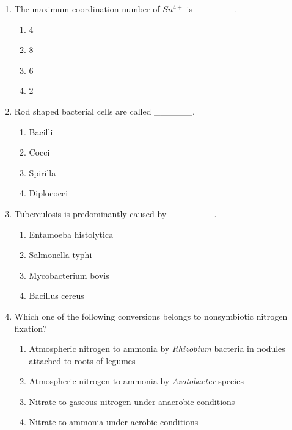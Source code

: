 \documentclass[journal]{IEEEtran}
\begin{document}
\begin{enumerate}
\item The maximum coordination number of $Sn^{4+}$ is \_\_\_\_\_\_.
\hfill{}

\begin{multicols}{2}
\begin{enumerate}
\item 4
\item 8
\item 6
\item 2
\end{enumerate}
\end{multicols}

\item Rod shaped bacterial cells are called \_\_\_\_\_\_.
\hfill{}

\begin{multicols}{2}
\begin{enumerate}
\item Bacilli
\item Cocci
\item Spirilla
\item Diplococci
\end{enumerate}
\end{multicols}

\item Tuberculosis is predominantly caused by \_\_\_\_\_\_\_.
\hfill{}

\begin{multicols}{2}
\begin{enumerate}
\item Entamoeba histolytica
\item Salmonella typhi
\item Mycobacterium bovis
\item Bacillus cereus
\end{enumerate}
\end{multicols}

\item Which one of the following conversions belongs to nonsymbiotic nitrogen fixation?
\hfill{}

\begin{enumerate}
\item Atmospheric nitrogen to ammonia by \textit{Rhizobium} bacteria in nodules attached to roots of legumes
\item Atmospheric nitrogen to ammonia by \textit{Azotobacter} species
\item Nitrate to gaseous nitrogen under anaerobic conditions
\item Nitrate to ammonia under aerobic conditions
\end{enumerate}


\end{enumerate}
\end{document}
